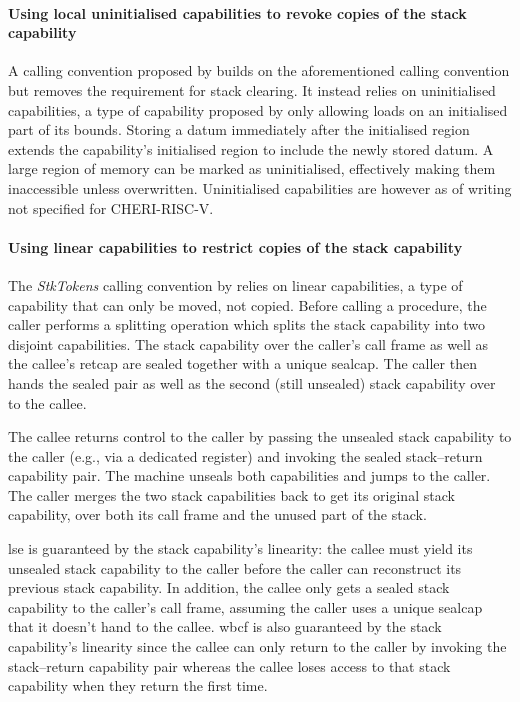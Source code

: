 \documentclass[main.tex]{subfiles}
\begin{document}
\paragraph{Using local uninitialised capabilities to revoke copies of the stack capability} A calling convention proposed by \cite{uninitcapss,uninitcaps} builds on the aforementioned calling convention but removes the requirement for stack clearing. It instead relies on uninitialised capabilities, a type of capability proposed by \cite{uninitcapss} only allowing loads on an initialised part of its bounds. Storing a datum immediately after the initialised region extends the capability's initialised region to include the newly stored datum. A large region of memory can be marked as uninitialised, effectively making them inaccessible unless overwritten. Uninitialised capabilities are however as of writing not specified for CHERI-RISC-V.

\paragraph{Using linear capabilities to restrict copies of the stack capability} The \emph{StkTokens} calling convention by \cite{stktokens} relies on linear capabilities, a type of capability that can only be moved, not copied. Before calling a procedure, the caller performs a splitting operation which splits the stack capability into two disjoint capabilities. The stack capability over the caller's call frame as well as the callee's \gls{retcap} are sealed together with a unique \gls{sealcap}. The caller then hands the sealed pair as well as the second (still unsealed) stack capability over to the callee.

The callee returns control to the caller by passing the unsealed stack capability to the caller (e.g., via a dedicated register) and invoking the sealed stack–return capability pair. The machine unseals both capabilities and jumps to the caller. The caller merges the two stack capabilities back to get its original stack capability, over both its call frame and the unused part of the stack.

\Gls{lse} is guaranteed by the stack capability's linearity: the callee must yield its unsealed stack capability to the caller before the caller can reconstruct its previous stack capability. In addition, the callee only gets a sealed stack capability to the caller's call frame, assuming the caller uses a unique \gls{sealcap} that it doesn't hand to the callee. \Gls{wbcf} is also guaranteed by the stack capability's linearity since the callee can only return to the caller by invoking the stack–return capability pair whereas the callee loses access to that stack capability when they return the first time. 
\end{document}
